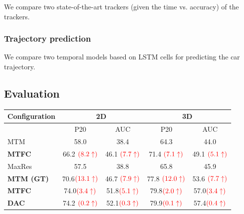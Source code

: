\documentclass[10pt,twocolumn,letterpaper]{article}
\begin{document}
We compare two state-of-the-art trackers (given the time vs. accuracy) of the trackers.

\subsubsection{Trajectory prediction}

We compare two temporal models based on LSTM cells for predicting the car trajectory.

\subsection{Evaluation}

\begin{table}[t]
\small
   \centering
        \begin{tabular}{|l|| *{2}{c}| *{2}{c} |}\hline
            {\small Configuration} & \multicolumn{2}{|c|}{\small 2D}  & \multicolumn{2}{|c|}{\small 3D}  \\ \hline \hline
                                                    & P20       & AUC       & P20       & AUC  \\ \hline \hline

            {\small MTM }                          &  58.0     &  38.4     & 64.3      & 44.0   \\
            \hline
            {\small \textbf{MTFC} }  &  66.2 ${\color{red}(8.2\uparrow)}$    &  46.1 ${\color{red}(7.7\uparrow)}$    &  71.4 ${\color{red}(7.1\uparrow)}$     &  49.1 ${\color{red}(5.1\uparrow)}$\\
            \hline
            \hline
            {\small MaxRes }                        &  57.5     &  38.8     &  65.8     &  45.9  \\
            \hline
            {\small \textbf{MTM (GT)} }        &  70.6${\color{red}(13.1\uparrow)}$     &  46.7  ${\color{red}(7.9\uparrow)}$   &  77.8 ${\color{red}(12.0\uparrow)}$    &  53.6 ${\color{red}(7.7\uparrow)}$ \\
            \hline
            \hline
            {\small \textbf{MTFC}}           &  74.0${\color{red}(3.4\uparrow)}$      &  51.8${\color{red}(5.1\uparrow)}$      &  79.8${\color{red}(2.0\uparrow)}$      &  57.0${\color{red}(3.4\uparrow)}$    \\
            \hline
            {\small \textbf{DAC}}&  74.2 ${\color{red}(0.2\uparrow)}$    &  52.1${\color{red}(0.3\uparrow)}$     &  79.9${\color{red}(0.1\uparrow)}$     &  57.4${\color{red}(0.4\uparrow)}$\\\hline


\end{tabular}
\end{table}
\end{document}
